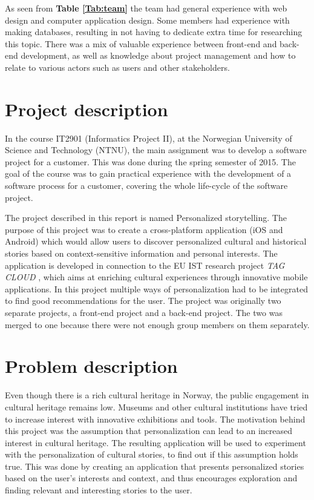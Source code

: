 As seen from \textbf{Table \ref{Tab:team}} the team had general experience with web design and computer application design. Some members had experience with making databases, resulting in not having to dedicate extra time for researching this topic. There was a mix of valuable experience between front-end and back-end development, as well as knowledge about project management and how to relate to various actors such as users and other stakeholders.

\section{Project description}

In the course IT2901 \cite{es20} (Informatics Project II), at the Norwegian University of Science and Technology (NTNU), the main assignment was to develop a software project for a customer. This was done during the spring semester of 2015. The goal of the course was to gain practical experience with the development of a software process for a customer, covering the whole life-cycle of the software project.\newline

The project described in this report is named Personalized storytelling. The purpose of this project was to create a cross-platform application (iOS and Android) which would allow users to discover personalized cultural and historical stories based on context-sensitive information and personal interests. The application is developed in connection to the EU IST research project \textit{TAG CLOUD} \cite{es21}, which aims at enriching cultural experiences through innovative mobile applications.
In this project multiple ways of personalization had to be integrated to find good recommendations for the user. The project was originally two separate projects, a front-end project and a back-end project. The two was merged to one because there were not enough group members on them separately. 

\section{Problem description}

Even though there is a rich cultural heritage in Norway, the public engagement in cultural heritage remains low. Museums and other cultural institutions have tried to increase interest with innovative exhibitions and tools. The motivation behind this project was the assumption that personalization can lead to an increased interest in cultural heritage. The resulting application will be used to experiment with the personalization of cultural stories, to find out if this assumption holds true. This was done by creating an application that presents personalized stories based on the user's interests and context, and thus encourages exploration and finding relevant and interesting stories to the user. \newline

